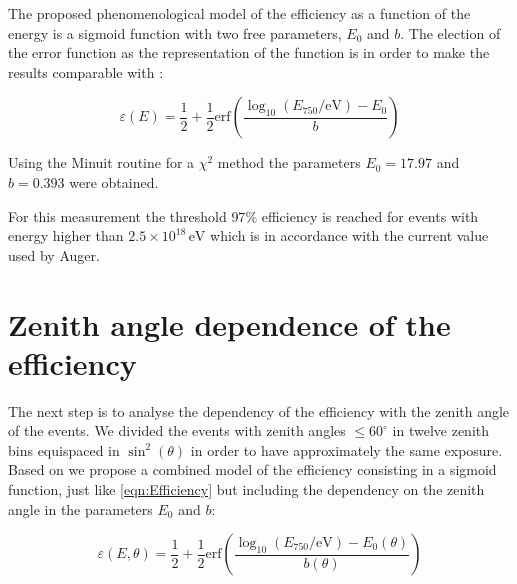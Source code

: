 \documentclass[12pt,a4paper]{article}
\newcommand{\eV}{\, \mathrm{eV}}
\begin{document}
The proposed phenomenological model of the efficiency as a function of the energy is a sigmoid function with two free parameters, $E_0$ and $b$. The election of the error function as the representation of the function is in order to make the results comparable with \cite{VerticalSpectrum}:

\begin{equation}
\varepsilon(E)=\frac{1}{2} + \frac{1}{2}\mathrm{erf}\left(\frac{\log_{10}(E_{750}/\mathrm{eV})-E_{0}}{b}\right)
\label{eqn:Efficiency}
\end{equation}

Using the Minuit routine for a $\chi^2$ method the parameters $E_0=17.97$ and $b=0.393$ were obtained.

For this measurement the threshold $97\%$ efficiency is reached for events with energy higher than $2.5\times10^{18}\eV$ which is in accordance with the current value used by Auger.




\section{Zenith angle dependence of the efficiency}
\label{sec:zenith}

The next step is to analyse the dependency of the efficiency with the zenith angle of the events. We divided the events with zenith angles $\leq60^{\circ}$ in twelve zenith bins equispaced in $\sin^2(\theta)$ in order to have approximately the same exposure. Based on \cite{VerticalSpectrum} we propose a combined model of the efficiency consisting in a sigmoid function, just like \cref{eqn:Efficiency} but including the dependency on the zenith angle in the parameters $E_0$ and $b$:

\begin{equation}
\varepsilon(E,\theta)=\frac{1}{2} + \frac{1}{2}\mathrm{erf}\left(\frac{\log_{10}(E_{750}/\mathrm{eV})-E_{0}(\theta)}{b(\theta)}\right)
\label{eqn:EffiZenith}
\end{equation}
\end{document}
